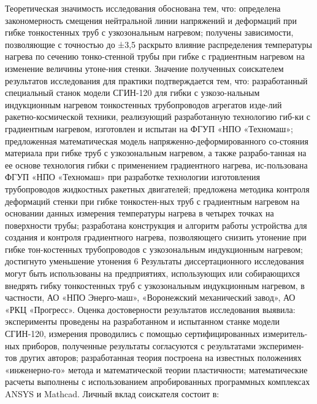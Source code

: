 Теоретическая значимость исследования обоснована тем, что:
определена закономерность смещения нейтральной линии напряжений и деформаций при гибке тонкостенных труб с узкозональным нагревом;
получены зависимости, позволяющие с точностью до ±3,5%
раскрыто влияние распределения температуры нагрева по сечению тонко-стенной трубы при гибке с градиентным нагревом на изменение величины утоне-ния стенки.
Значение полученных соискателем результатов исследования для практики подтверждается тем, что: 
разработанный специальный станок модели СГИН-120 для гибки с узкозо-нальным индукционным нагревом тонкостенных трубопроводов агрегатов изде-лий ракетно-космической техники, реализующий разработанную технологию гиб-ки с градиентным нагревом, изготовлен и испытан на ФГУП «НПО «Техномаш»;
предложенная математическая модель напряженно-деформированного со-стояния материала при гибке труб с узкозональным нагревом, а также разрабо-танная на ее основе технология гибки с применением градиентного нагрева, ис-пользована ФГУП «НПО «Техномаш» при разработке технологии изготовления трубопроводов жидкостных ракетных двигателей;
предложена методика контроля деформаций стенки при гибке тонкостен-ных труб с градиентным нагревом на основании данных измерения температуры нагрева в четырех точках на поверхности трубы;
разработана конструкция и алгоритм работы устройства для создания и контроля градиентного нагрева, позволяющего снизить утонение при гибке тон-костенных трубопроводов с узкозональным индукционным нагревом;
достигнуто уменьшение утонения 6%
Результаты диссертационного исследования могут быть использованы на предприятиях, использующих или собирающихся внедрять гибку тонкостенных труб с узкозональным индукционным нагревом, в частности, АО «НПО Энерго-маш», «Воронежский механический завод», АО «РКЦ «Прогресс».
Оценка достоверности результатов исследования выявила:
эксперименты проведены на разработанном и испытанном станке модели СГИН-120, измерения проводились с помощью сертифицированных измеритель-ных приборов, полученные результаты согласуются с результатами эксперимен-тов других авторов;
разработанная теория построена на известных положениях «инженерно-го» метода и математической теории пластичности;
математические расчеты выполнены с использованием апробированных программных комплексах ANSYS и Mathcad.
Личный вклад соискателя состоит в: 
